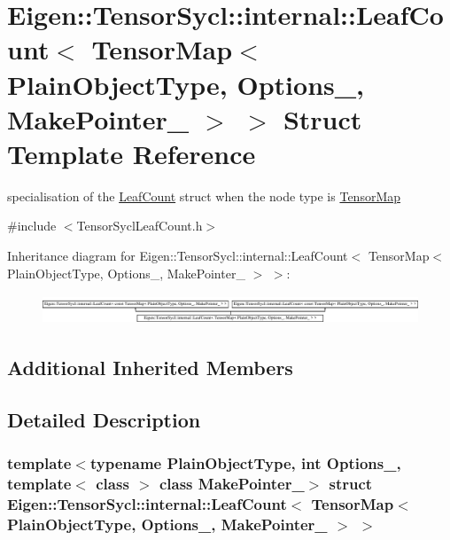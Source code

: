 \hypertarget{struct_eigen_1_1_tensor_sycl_1_1internal_1_1_leaf_count_3_01_tensor_map_3_01_plain_object_type_0624646cd155dec3a2f37d211ae188af3}{}\section{Eigen\+:\+:Tensor\+Sycl\+:\+:internal\+:\+:Leaf\+Count$<$ Tensor\+Map$<$ Plain\+Object\+Type, Options\+\_\+, Make\+Pointer\+\_\+ $>$ $>$ Struct Template Reference}
\label{struct_eigen_1_1_tensor_sycl_1_1internal_1_1_leaf_count_3_01_tensor_map_3_01_plain_object_type_0624646cd155dec3a2f37d211ae188af3}


specialisation of the \hyperlink{struct_eigen_1_1_tensor_sycl_1_1internal_1_1_leaf_count}{Leaf\+Count} struct when the node type is \hyperlink{class_eigen_1_1_tensor_map}{Tensor\+Map}  




{\ttfamily \#include $<$Tensor\+Sycl\+Leaf\+Count.\+h$>$}

Inheritance diagram for Eigen\+:\+:Tensor\+Sycl\+:\+:internal\+:\+:Leaf\+Count$<$ Tensor\+Map$<$ Plain\+Object\+Type, Options\+\_\+, Make\+Pointer\+\_\+ $>$ $>$\+:\begin{figure}[H]
\begin{center}
\leavevmode
\includegraphics[height=0.903226cm]{struct_eigen_1_1_tensor_sycl_1_1internal_1_1_leaf_count_3_01_tensor_map_3_01_plain_object_type_0624646cd155dec3a2f37d211ae188af3}
\end{center}
\end{figure}
\subsection*{Additional Inherited Members}


\subsection{Detailed Description}
\subsubsection*{template$<$typename Plain\+Object\+Type, int Options\+\_\+, template$<$ class $>$ class Make\+Pointer\+\_\+$>$\newline
struct Eigen\+::\+Tensor\+Sycl\+::internal\+::\+Leaf\+Count$<$ Tensor\+Map$<$ Plain\+Object\+Type, Options\+\_\+, Make\+Pointer\+\_\+ $>$ $>$}

